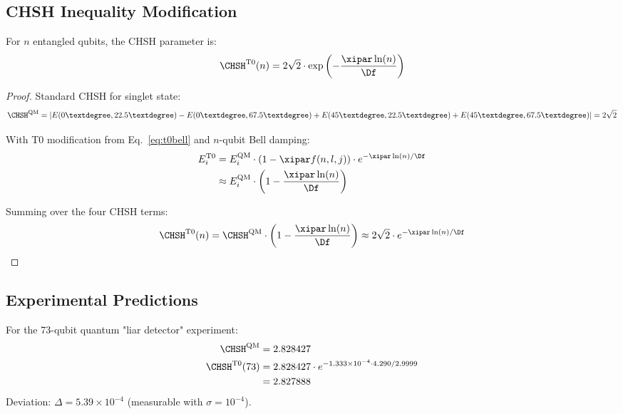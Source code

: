 \subsection{CHSH Inequality Modification}

\begin{proposition}
	For $n$ entangled qubits, the CHSH parameter is:
	\begin{equation}
		\CHSH^{\text{T0}}(n) = 2\sqrt{2} \cdot \exp\left(-\frac{\xipar \ln(n)}{\Df}\right)
		\label{eq:chsh_t0}
	\end{equation}
\end{proposition}

\begin{proof}
	Standard CHSH for singlet state:
	\begin{equation}
		\CHSH^{\text{QM}} = |E(0°, 22.5°) - E(0°, 67.5°) + E(45°, 22.5°) + E(45°, 67.5°)| = 2\sqrt{2}
	\end{equation}
	
	With T0 modification from Eq.~\eqref{eq:t0bell} and $n$-qubit Bell damping:
	\begin{align}
		E^{\text{T0}}_i &= E^{\text{QM}}_i \cdot \left(1 - \xipar f(n,l,j)\right) \cdot e^{-\xipar\ln(n)/\Df} \\
		&\approx E^{\text{QM}}_i \cdot \left(1 - \frac{\xipar \ln(n)}{\Df}\right)
	\end{align}
	
	Summing over the four CHSH terms:
	\begin{equation}
		\CHSH^{\text{T0}}(n) = \CHSH^{\text{QM}} \cdot \left(1 - \frac{\xipar \ln(n)}{\Df}\right) \approx 2\sqrt{2} \cdot e^{-\xipar\ln(n)/\Df}
	\end{equation}
\end{proof}

\subsection{Experimental Predictions}
\label{sec:experiments}
\begin{experimentbox}
	For the 73-qubit quantum "liar detector" experiment:
	\begin{align}
		\CHSH^{\text{QM}} &= 2.828427 \\
		\CHSH^{\text{T0}}(73) &= 2.828427 \cdot e^{-1.333 \times 10^{-4} \cdot 4.290/2.9999} \\
		&= 2.827888
	\end{align}
	Deviation: $\Delta = 5.39 \times 10^{-4}$ (measurable with $\sigma = 10^{-4}$).
\end{experimentbox}

